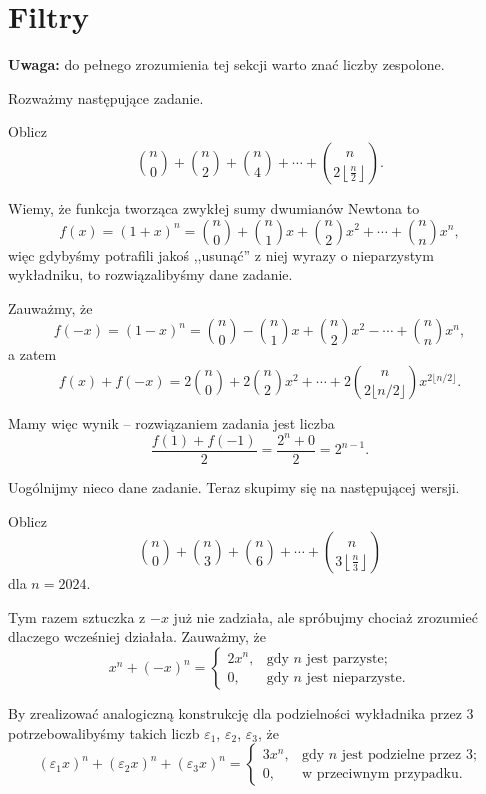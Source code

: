 \documentclass[shortabstract]{imthesis}
\begin{document}
\section{Filtry}

\textbf{Uwaga: } do pełnego zrozumienia tej sekcji warto znać liczby zespolone.

Rozważmy następujące zadanie.

\begin{problem}
    Oblicz
    $$
    {n \choose 0} + {n \choose 2} + {n \choose 4} + \cdots + {n \choose 2\left\lfloor \frac{n}{2} \right\rfloor}.
    $$
\end{problem}

Wiemy, że funkcja tworząca zwykłej sumy dwumianów Newtona to
$$
f(x) = (1+x)^n = {n \choose 0} + {n \choose 1}x + {n \choose 2}x^2 + \cdots + {n \choose n} x^n,
$$
więc gdybyśmy potrafili jakoś ,,usunąć'' z niej wyrazy o nieparzystym wykładniku, to rozwiązalibyśmy dane zadanie.

Zauważmy, że
$$
f(-x) = (1-x)^n = {n \choose 0} - {n \choose 1}x + {n \choose 2}x^2 - \cdots + {n \choose n} x^n,
$$
a zatem
$$
f(x) + f(-x) = 2{n \choose 0} + 2{n \choose 2}x^2 + \cdots + 2{n \choose 2\lfloor n/2 \rfloor}x^{2\lfloor n/2 \rfloor}.
$$

Mamy więc wynik -- rozwiązaniem zadania jest liczba
$$
\frac{f(1)+f(-1)}{2} = \frac{2^n+0}{2} = 2^{n-1}.
$$

Uogólnijmy nieco dane zadanie. Teraz skupimy się na następującej wersji.

\begin{problem}
    Oblicz
    $$
    {n \choose 0} + {n \choose 3} + {n \choose 6} + \cdots + {n \choose 3\left\lfloor \frac{n}{3} \right\rfloor}
    $$
    dla $n = 2024$.
\end{problem}

Tym razem sztuczka z $-x$ już nie zadziała, ale spróbujmy chociaż zrozumieć dlaczego wcześniej działała. Zauważmy, że
$$
x^{n} + (-x)^{n} = \begin{cases} 2x^n, &\text{gdy $n$ jest parzyste;} \\ 0, &\text{gdy $n$ jest nieparzyste.} \end{cases} 
$$

By zrealizować analogiczną konstrukcję dla podzielności wykładnika przez $3$ potrzebowalibyśmy takich liczb $\varepsilon_1$, $\varepsilon_2$, $\varepsilon_3$, że
$$
(\varepsilon_1x)^n + (\varepsilon_2x)^n + (\varepsilon_3x)^n = \begin{cases} 3x^n, &\text{gdy $n$ jest podzielne przez $3$;} \\ 0, &\text{w przeciwnym przypadku.} \end{cases}
$$
\end{document}
